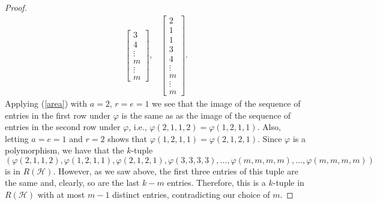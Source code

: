 \documentclass[11 pt]{amsart}
\theoremstyle{definition}
\theoremstyle{case}
\numberwithin{equation}{section}
\begin{document}
\begin{proof}
\[\begin{array}{cccc}
\begin{bmatrix}
           3 \\
           4\\
           \vdots \\
           m\\
           \vdots \\
           m
         \end{bmatrix}  ,       
&         
         \begin{bmatrix}
           2 \\
           1 \\
           1 \\
           3 \\
           4\\
           \vdots \\
           m\\
           \vdots \\
           m
         \end{bmatrix} .
         \end{array}
         \]
Applying (\ref{area}) with $a=2$, $r=e=1$ we see that the image of the sequence of entries in the first row under $\varphi$ is the same as as the image of the sequence of entries in the second row under $\varphi$, i.e., $\varphi(2,1,1,2)=\varphi(1,2,1,1)$. Also, letting $a=e=1$ and $r=2$ shows that $\varphi(1,2,1,1)=\varphi(2,1,2,1)$. Since $\varphi$ is a polymorphism, we have that the $k$-tuple
\[(\varphi(2,1,1,2),\varphi(1,2,1,1), \varphi(2,1,2,1),\varphi(3,3,3,3),\dots, \varphi(m,m,m,m),\dots, \varphi(m,m,m,m))\]
is in $R(\mathcal{H})$. However, as we saw above, the first three entries of this tuple are the same and, clearly, so are the last $k-m$ entries. Therefore, this is a $k$-tuple in $R(\mathcal{H})$ with at most $m-1$ distinct entries, contradicting our choice of $m$. 


\end{proof}
\end{document}
